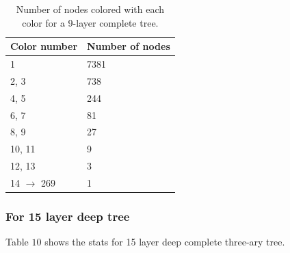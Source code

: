 \documentclass{article}
\theoremstyle{remark}
\begin{document}
\begin{table}[h]
    \centering
    \begin{tabular}{|l|l|}
        \hline
        \textbf{Color number} & \textbf{Number of nodes} \\ \hline
        1                      & 7381                      \\ \hline
        2, 3                      & 738                       \\ \hline
        4, 5                      & 244                       \\ \hline
        6, 7                      & 81                        \\ \hline
        8, 9                      & 27                        \\ \hline
        10, 11                     & 9                         \\ \hline
        12, 13                     & 3                         \\ \hline
        14 $\to$ 269  & 1\\ \hline
    \end{tabular}
    \caption{Number of nodes colored with each color for a 9-layer complete tree.}
    \label{tab:colors}
\end{table}

\subsubsection{For 15 layer deep tree}
Table $10$ shows the stats for 15 layer deep complete three-ary tree.
\end{document}

